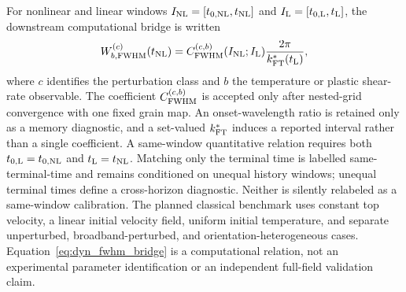 For nonlinear and linear windows
$I_{\rm NL}=[t_{0,\rm NL},t_{\rm NL}]$ and
$I_{\rm L}=[t_{0,\rm L},t_{\rm L}]$, the downstream computational bridge is
written
\begin{equation}
 W_{b,\mathrm{FWHM}}^{(c)}(t_{\rm NL})
 =C_{\rm FWHM}^{(c,b)}(I_{\rm NL};I_{\rm L})
  \frac{2\pi}{k_{\rm FT}^*(t_{\rm L})},
 \label{eq:dyn_fwhm_bridge}
\end{equation}
where $c$ identifies the perturbation class and $b$ the temperature or plastic
shear-rate observable.  The coefficient $C_{\rm FWHM}^{(c,b)}$ is accepted only after
nested-grid convergence with one fixed grain map.  An onset-wavelength ratio is
retained only as a memory diagnostic, and a set-valued $k_{\rm FT}^*$ induces a reported
interval rather than a single coefficient.  A same-window quantitative
relation requires both $t_{0,\rm L}=t_{0,\rm NL}$ and
$t_{\rm L}=t_{\rm NL}$.  Matching only the terminal time is labelled
same-terminal-time and remains conditioned on unequal history windows; unequal
terminal times define a cross-horizon diagnostic.  Neither is silently
relabeled as a same-window calibration.  The planned classical benchmark
uses constant top velocity, a linear initial velocity field, uniform initial
temperature, and separate unperturbed, broadband-perturbed, and
orientation-heterogeneous cases.  Equation~\eqref{eq:dyn_fwhm_bridge} is a
computational relation, not an experimental parameter identification or an
independent full-field validation claim.
